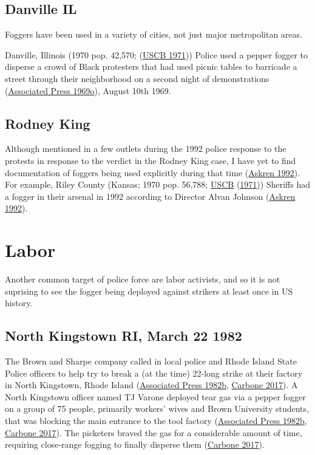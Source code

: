 \documentclass[
  11pt,
]{krantz}
\begin{document}
\hypertarget{danville-il}{%
\subsection{Danville IL}\label{danville-il}}

Foggers have been used in a variety of cities, not just major metropolitan areas.

Danville, Illinois (1970 pop. 42,570; (\protect\hyperlink{ref-USCB1970}{USCB 1971})) Police used a pepper fogger to disperse a crowd of Black protesters that had used picnic tables to barricade a street through their neighborhood on a second night of demonstrations (\protect\hyperlink{ref-Palladium-Item1969}{Associated Press 1969o}), August 10th 1969.

\hypertarget{rodney-king}{%
\subsection{Rodney King}\label{rodney-king}}

Although mentioned in a few outlets during the 1992 police response to the protests in response to the verdict in the Rodney King case, I have yet to find documentation of foggers being used explicitly during that time (\protect\hyperlink{ref-Askren1992}{Askren 1992}).
For example, Riley County (Kansas; 1970 pop. 56,788; \protect\hyperlink{ref-USCB1970}{USCB} (\protect\hyperlink{ref-USCB1970}{1971})) Sheriffs had a fogger in their arsenal in 1992 according to Director Alvan Johnson (\protect\hyperlink{ref-Askren1992}{Askren 1992}).

\hypertarget{labor}{%
\section{Labor}\label{labor}}

Another common target of police force are labor activists, and so it is not suprising to see the fogger being deployed against strikers at least once in US history.

\hypertarget{north-kingstown-ri-march-22-1982}{%
\subsection{North Kingstown RI, March 22 1982}\label{north-kingstown-ri-march-22-1982}}

The Brown and Sharpe company called in local police and Rhode Island State Police officers to help try to break a (at the time) 22-long strike at their factory in North Kingstown, Rhode Island (\protect\hyperlink{ref-TheLexingtonHerald1982_03_23}{Associated Press 1982b}, \protect\hyperlink{ref-Carbone2017}{Carbone 2017}).
A North Kingstown officer named TJ Varone deployed tear gas via a pepper fogger on a group of 75 people, primarily workers' wives and Brown University students, that was blocking the main entrance to the tool factory (\protect\hyperlink{ref-TheLexingtonHerald1982_03_23}{Associated Press 1982b}, \protect\hyperlink{ref-Carbone2017}{Carbone 2017}).
The picketers braved the gas for a considerable amount of time, requiring close-range fogging to finally disperse them (\protect\hyperlink{ref-Carbone2017}{Carbone 2017}).
\end{document}
